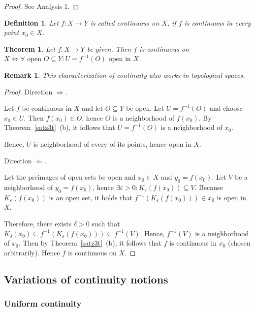\documentclass{article}
\newtheorem{theorem}{Theorem}  \numberwithin{theorem}{section}
\newtheorem{definition}{Definition}  \numberwithin{definition}{section}
\newtheorem{remark}{Remark}  \numberwithin{remark}{section}
\begin{document}
\begin{proof}
  See Analysis 1.
\end{proof}

\begin{definition} %
  Let $f: X \to Y$ is called continuous on $X$, if $f$ is continuous in every point $x_0 \in X$.
\end{definition}

\begin{theorem} %
  Let $f: X \to Y$ be given.
  Then $f$ is continuous on $X \iff \forall \text{ open } O \subseteq Y: U = f^{-1}(O) \text{ open in } X$.
\end{theorem}

\begin{remark}
  This characterization of continuity also works in topological spaces.
\end{remark}

\begin{proof}
  Direction $\Rightarrow$.

  Let $f$ be continuous in $X$ and let $O \subseteq Y$ be open. Let $U = f^{-1}(O)$ and choose $x_0 \in U$. Then $f(x_0) \in O$, hence $O$ is a neighborhood of $f(x_0)$. By Theorem~\ref{satz3t}~(b), it follows that $U = f^{-1}(O)$ is a neighborhood of $x_0$.

  Hence, $U$ is neighborhood of every of its points, hence open in $X$.

  Direction $\Leftarrow$.

  Let the preimages of open sets be open and $x_0 \in X$ and $y_0 = f(x_0)$.
  Let $V$ be a neighborhood of $y_0 = f(x_0)$, hence $\exists \varepsilon > 0: K_{\varepsilon}(f(x_0)) \subseteq V$. Because $K_{\varepsilon}(f(x_0))$ is an open set, it holds that $f^{-1}(K_{\varepsilon}(f(x_0))) \in x_0$ is open in $X$.

  Therefore, there exists $\delta > 0$ such that $K_{\delta}(x_0) \subseteq f^{-1}(K_{\varepsilon}(f(x_0))) \subseteq f^{-1}(V)$. Hence, $f^{-1}(V)$ is a neighborhood of $x_0$. Then by Theorem~\ref{satz3t}~(b), it follows that $f$ is continuous in $x_0$ (chosen arbitrarily). Hence $f$ is continuous on $X$.
\end{proof}

\subsection{Variations of continuity notions}
\subsubsection{Uniform continuity}
\end{document}
